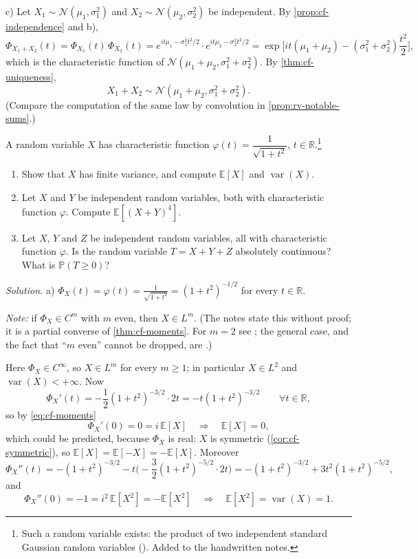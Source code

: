 \begin{example}
c) Let $X_1\sim\mathcal N(\mu_1,\sigma_1^2)$ and $X_2\sim\mathcal N(\mu_2,\sigma_2^2)$ be
independent. By \cref{prop:cf-independence} and b),
\[
  \Phi_{X_1+X_2}(t)=\Phi_{X_1}(t)\,\Phi_{X_2}(t)=e^{it\mu_1-\sigma_1^2t^2/2}\cdot e^{it\mu_2-\sigma_2^2t^2/2}
  =\exp\Big[it(\mu_1+\mu_2)-(\sigma_1^2+\sigma_2^2)\frac{t^2}2\Big],
\]
which is the characteristic function of $\mathcal N(\mu_1+\mu_2,\sigma_1^2+\sigma_2^2)$. By
\cref{thm:cf-uniqueness},
\[
  X_1+X_2\sim\mathcal N(\mu_1+\mu_2,\sigma_1^2+\sigma_2^2).
\]
(Compare the computation of the same law by convolution in \cref{prop:rv-notable-sums}.)
\end{example}

\begin{example}\label{exa:cf-one-over-sqrt}
A random variable $X$ has characteristic function
$\varphi(t)=\dfrac1{\sqrt{1+t^2}}$, $t\in\mathbb R$.\footnote{Such a random variable exists: the
product of two independent standard Gaussian random variables
(). Added to the handwritten notes.}
\begin{enumerate}[label=\alph*)]
  \item Show that $X$ has finite variance, and compute $\mathbb E[X]$ and $\operatorname{var}(X)$.
  \item Let $X$ and $Y$ be independent random variables, both with characteristic function
    $\varphi$. Compute $\mathbb E[(X+Y)^4]$.
  \item Let $X$, $Y$ and $Z$ be independent random variables, all with characteristic function
    $\varphi$. Is the random variable $T=X+Y+Z$ absolutely continuous? What is
    $\mathbb P(T\ge0)$?
\end{enumerate}

\emph{Solution.} a) $\Phi_X(t)=\varphi(t)=\frac1{\sqrt{1+t^2}}=(1+t^2)^{-1/2}$ for every
$t\in\mathbb R$.

\emph{Note:} if $\Phi_X\in C^m$ with $m$ even, then $X\in L^m$. (The notes state this without
proof; it is a partial converse of \cref{thm:cf-moments}. For $m=2$ see
\citet[Section~3.3.3]{durrett}; the general case, and the fact that ``$m$ even'' cannot be
dropped, are .)

Here $\Phi_X\in C^\infty$, so $X\in L^m$ for every $m\ge1$; in particular $X\in L^2$ and
$\operatorname{var}(X)<+\infty$. Now
\[
  \Phi_X'(t)=-\frac12(1+t^2)^{-3/2}\cdot2t=-t(1+t^2)^{-3/2}\qquad\forall t\in\mathbb R,
\]
so by \eqref{eq:cf-moments}
\[
  \Phi_X'(0)=0=i\,\mathbb E[X]\quad\Longrightarrow\quad\mathbb E[X]=0,
\]
which could be predicted, because $\Phi_X$ is real: $X$ is symmetric (\cref{cor:cf-symmetric}),
so $\mathbb E[X]=\mathbb E[-X]=-\mathbb E[X]$. Moreover
\[
  \Phi_X''(t)=-(1+t^2)^{-3/2}-t\Big(-\frac32(1+t^2)^{-5/2}\cdot2t\Big)
  =-(1+t^2)^{-3/2}+3t^2(1+t^2)^{-5/2},
\]
and
\[
  \Phi_X''(0)=-1=i^2\,\mathbb E[X^2]=-\mathbb E[X^2]\quad\Longrightarrow\quad
  \mathbb E[X^2]=\operatorname{var}(X)=1 .
\]


\end{example}
